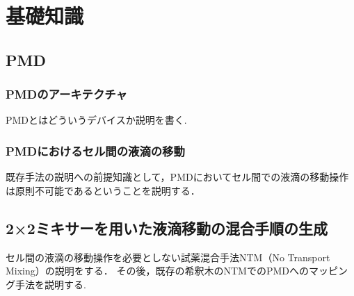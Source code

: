 \chapter{基礎知識}
\section{PMD}
\subsection{PMDのアーキテクチャ}
PMDとはどういうデバイスか説明を書く.
\subsection{PMDにおけるセル間の液滴の移動}
既存手法の説明への前提知識として，PMDにおいてセル間での液滴の移動操作は原則不可能であるということを説明する．
\section{{2×2ミキサーを用いた液滴移動の混合手順の生成}}
セル間の液滴の移動操作を必要としない試薬混合手法NTM（No Transport Mixing）の説明をする．
その後，既存の希釈木のNTMでのPMDへのマッピング手法を説明する.
